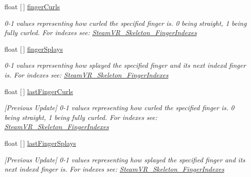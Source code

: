 \begin{DoxyCompactItemize}
float \mbox{[}$\,$\mbox{]} \mbox{\hyperlink{class_valve_1_1_v_r_1_1_steam_v_r___action___skeleton_aea32ec100629c38fab02df8ad0c8437e}{finger\+Curls}}
\begin{DoxyCompactList}\small\item\em 0-\/1 values representing how curled the specified finger is. 0 being straight, 1 being fully curled. For indexes see\+: \mbox{\hyperlink{class_valve_1_1_v_r_1_1_steam_v_r___skeleton___finger_indexes}{Steam\+V\+R\+\_\+\+Skeleton\+\_\+\+Finger\+Indexes}} \end{DoxyCompactList}\item 
float \mbox{[}$\,$\mbox{]} \mbox{\hyperlink{class_valve_1_1_v_r_1_1_steam_v_r___action___skeleton_ac7eb975e0367698e976957e9f9acd8a1}{finger\+Splays}}
\begin{DoxyCompactList}\small\item\em 0-\/1 values representing how splayed the specified finger and it\textquotesingle{}s next index\textquotesingle{}d finger is. For indexes see\+: \mbox{\hyperlink{class_valve_1_1_v_r_1_1_steam_v_r___skeleton___finger_indexes}{Steam\+V\+R\+\_\+\+Skeleton\+\_\+\+Finger\+Indexes}} \end{DoxyCompactList}\item 
float \mbox{[}$\,$\mbox{]} \mbox{\hyperlink{class_valve_1_1_v_r_1_1_steam_v_r___action___skeleton_abc27a8dd78d0d1a5fb582742c22bab6f}{last\+Finger\+Curls}}
\begin{DoxyCompactList}\small\item\em \mbox{[}Previous Update\mbox{]} 0-\/1 values representing how curled the specified finger is. 0 being straight, 1 being fully curled. For indexes see\+: \mbox{\hyperlink{class_valve_1_1_v_r_1_1_steam_v_r___skeleton___finger_indexes}{Steam\+V\+R\+\_\+\+Skeleton\+\_\+\+Finger\+Indexes}} \end{DoxyCompactList}\item 
float \mbox{[}$\,$\mbox{]} \mbox{\hyperlink{class_valve_1_1_v_r_1_1_steam_v_r___action___skeleton_aae1f7b7aafe12885bc7388e2f7733ff4}{last\+Finger\+Splays}}
\begin{DoxyCompactList}\small\item\em \mbox{[}Previous Update\mbox{]} 0-\/1 values representing how splayed the specified finger and it\textquotesingle{}s next index\textquotesingle{}d finger is. For indexes see\+: \mbox{\hyperlink{class_valve_1_1_v_r_1_1_steam_v_r___skeleton___finger_indexes}{Steam\+V\+R\+\_\+\+Skeleton\+\_\+\+Finger\+Indexes}} \end{DoxyCompactList}\item 

\end{DoxyCompactItemize}
